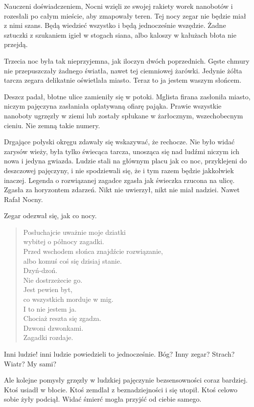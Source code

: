 Nauczeni doświadczeniem, Nocni wzięli ze swojej rakiety worek nanobotów i rozesłali po całym mieście, aby zmapowały teren.
Tej nocy zegar nie będzie miał z nimi szans.
Będą wiedzieć wszystko i będą jednocześnie wszędzie.
Żadne sztuczki z szukaniem igieł w stogach siana, albo kaloszy w kałużach błota nie przejdą.

Trzecia noc była tak nieprzyjemna, jak iloczyn dwóch poprzednich.
Gęste chmury nie przepuszczały żadnego światła, nawet tej ciemniowej żarówki.
Jedynie żółta tarcza zegara delikatnie oświetlała miasto.
Teraz to ja jestem waszym słońcem.

Deszcz padał, błotne ulice zamieniły się w potoki.
Mglista firana zasłoniła miasto, niczym pajęczyna zasłaniała oplatywaną ofiarę pająka.
Prawie wszystkie nanoboty ugrzęzły w ziemi lub zostały spłukane w żarłocznym, wszechobecnym cieniu.
Nie zemną takie numery.

Drgające połyski okręgu zdawały się wskazywać, że rechocze.
Nie było widać zarysów wieży, była tylko świecąca tarcza, unosząca się nad ludźmi niczym ich nowa i jedyna gwiazda.
Ludzie stali na głównym placu jak co noc, przyklejeni do deszczowej pajęczyny, i nie spodziewali się, że i tym razem będzie jakkolwiek inaczej.
Legenda o rozwiązanej zagadce zgasła jak świeczka rzucona na ulicę. Zgasła za horyzontem zdarzeń.
Nikt nie uwierzył, nikt nie miał nadziei.
Nawet Rafał Nocny.

Zegar odezwał się, jak co nocy.

\begin{sl}
\begin{quote}
Posłuchajcie uważnie moje dziatki \\
wybitej o północy zagadki. \\
Przed wschodem słońca znajdźcie rozwiązanie, \\
albo komuś coś się dzisiaj stanie. \\
Dzyń-dzoń. \\
Nie dostrzeżecie go. \\
Jest pewien byt, \\
co wszystkich morduje w mig. \\
I to nie jestem ja. \\
Chociaż reszta się zgadza. \\
Dzwoni dzwonkami. \\
Zagadki rozdaje. \\
\end{quote}
\end{sl}

\begin{dialogue}
	\ds{} Inni ludzie! \dm{} inni ludzie powiedzieli to jednocześnie.
	\ds{} Bóg?
	\ds{} Inny zegar?
	\ds{} Strach?
	\ds{} Wiatr?
	\ds{} My sami?
\end{dialogue}
Ale kolejne pomysły grzęzły w ludzkiej pajęczynie bezsensowności coraz bardziej.
Ktoś usiadł w błocie.
Ktoś zemdlał z beznadziejności i się utopił.
Ktoś celowo sobie żyły podciął.
Widać śmierć mogła przyjść od ciebie samego.

